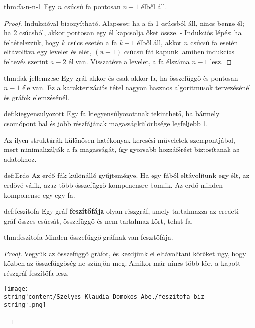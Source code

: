 \begin{theorem}{thm:fa-n-n-1}
Egy $n$ csúcsú fa pontosan $n-1$ élből áll.
\end{theorem}
\begin{proof}
Indukcióval bizonyítható. Alapeset: ha a fa
1 csúcsból áll, nincs benne él; ha 2 csúcsból, akkor pontosan egy
él kapcsolja őket össze. - Indukciós lépés: ha feltételezzük, hogy
$k$ csúcs esetén a fa $k-1$ élből áll, akkor $n$ csúcsú fa esetén
eltávolítva egy levelet és élét, $(n-1)$ csúcsú fát kapunk, amiben
indukciós feltevés szerint $n-2$ él van. Visszatéve a levelet, a
fa élszáma $n-1$ lesz.
\end{proof}

\begin{theorem}{thm:fak-jellemzese}
Egy gráf akkor és csak akkor fa, ha összefüggő és pontosan $n-1$
éle van. Ez a karakterizációs tétel nagyon hasznos algoritmusok tervezésénél
és gráfok elemzésénél.
\end{theorem}

\begin{definition}{def:kiegyensulyozott}
Egy fa kiegyensúlyozottnak tekinthető, ha bármely csomópont bal és
jobb részfájának magasságkülönbsége legfeljebb 1. 
\end{definition}
Az ilyen struktúrák
különösen hatékonyak keresési műveletek szempontjából, mert minimalizálják
a fa magasságát, így gyorsabb hozzáférést biztosítanak az adatokhoz.

\begin{definition}[Erdő]{def:Erdo}
Az erdő fák különálló gyűjteménye. Ha egy fából eltávolítunk egy élt,
az erdővé válik, azaz több összefüggő komponensre bomlik. Az erdő
minden komponense egy-egy fa.
\end{definition}

\begin{definition}[Feszítőfa]{def:feszitofa}
Egy gráf \textbf{feszítőfája} olyan részgráf, amely tartalmazza az
eredeti gráf összes csúcsát, összefüggő és nem tartalmaz kört, tehát
fa.
\end{definition}

\begin{theorem}{thm:feszitofa}
Minden összefüggő gráfnak van feszítőfája.
\end{theorem}
\begin{proof}
Vegyük az összefüggő gráfot, és kezdjünk el eltávolítani
köröket úgy, hogy közben az összefüggőség ne szűnjön meg. Amikor már
nincs több kör, a kapott részgráf feszítőfa lesz.
\begin{center}
	\texttt{[image: \\string"content/Szelyes\_Klaudia-Domokos\_Abel/feszitofa\_biz\\string".png]}
	\par\end{center}
\end{proof}



